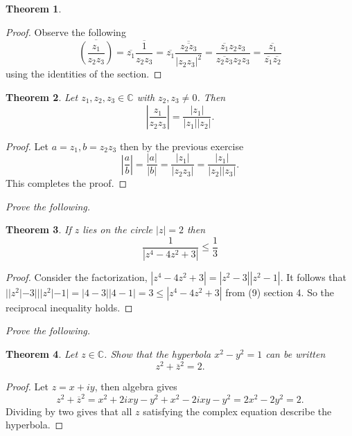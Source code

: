 \documentclass[letter]{article}
\newtheorem{theorem}{Theorem}
\newenvironment{menumerate}{%
  \edef\backupindent{\the\parindent}%
  \enumerate%
  \setlength{\parindent}{\backupindent}%
}{\endenumerate}
\begin{document}
\begin{menumerate}
\begin{theorem}
\begin{equation}
		\end{equation}
	\end{theorem}
	\begin{proof}
		Observe the following
		\begin{equation}
			\overline{\left(\frac{z_1}{z_2z_3}\right)} = \overline{z_1}\overline{\frac{1}{z_2z_3}} =\overline{z_1}\overline{\frac{\overline{z_2z_3}}{|z_2z_3|^2}} = \frac{\overline{z_1}z_2z_3}{\overline{z_2z_3}z_2z_3} = \frac{\overline{z_1}}{\overline{z_1}\overline{z_2}}
		\end{equation}
		using the identities of the section.
	\end{proof}
	\begin{theorem}
		Let $z_1, z_2, z_3 \in \mathbb{C}$ with $z_2, z_3 \neq 0$. Then 
		\begin{equation}
			\left|\frac{z_1}{z_2z_3}\right| = \frac{|z_1|}{|z_1||z_2|}.
		\end{equation}
	\end{theorem}
	\begin{proof}
		Let $a=z_1, b= z_2z_3$ then by the previous exercise
		\begin{equation}
			\left|\frac{a}{b}\right| = \frac{|a|}{|b|} = \frac{|z_1|}{|z_2z_3|} = \frac{|z_1|}{|z_2||z_3|}.	
		\end{equation}
		This completes the proof.
	\end{proof}

	\setcounter{enumi}{8}
	\item \emph{Prove the following.}
	\begin{theorem}
		If $z$ lies on the circle $|z| = 2$ then
		\begin{equation}
			\frac{1}{|z^4 - 4z^2 + 3|} \leq \frac{1}{3}	
		\end{equation}
	\end{theorem}
	\begin{proof}
		Consider the factorization, $|z^4 - 4z^2 +3| = |z^2 -3||z^2 - 1|.$ It follows that $||z^2| -3|||z^2| - 1| = |4-3||4-1| = 3\leq |z^4 - 4z^2 +3|$ from (9) section 4. So the reciprocal inequality holds.
	\end{proof}

	\setcounter{enumi}{13}
	\item \emph{Prove the following.}
	\begin{theorem}
		Let $z \in \mathbb{C}$. Show that the hyperbola $x^2 - y^2 = 1$ can be written
		\begin{equation}
			z^2 + \overline{z}^2 = 2.	
		\end{equation}
	\end{theorem}
	\begin{proof}
		Let $z = x + iy$, then algebra gives
		\begin{equation}
			z^2 + \overline{z}^2 = x^2 + 2ixy -y^2 + x^2 -2ixy -y^2 = 2x^2 -2y^2 = 2.
		\end{equation}
		Dividing by two gives that all $z$ satisfying the complex equation describe the hyperbola.
	\end{proof}
\end{menumerate}
\end{document}
